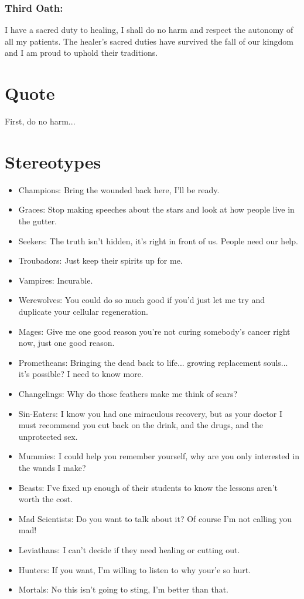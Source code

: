 \subsubsection*{Third Oath:} I have a sacred duty to healing, I shall do no harm and respect the autonomy of all my patients. The healer's sacred duties have survived the fall of our kingdom and I am proud to uphold their traditions.

\section*{Quote}

First, do no harm...

\section*{Stereotypes}
\begin{itemize}
\item Champions: Bring the wounded back here, I'll be ready. 
\item Graces: Stop making speeches about the stars and look at how people live in the gutter. 
\item Seekers: The truth isn't hidden, it's right in front of us. People need our help. 
\item Troubadors: Just keep their spirits up for me. 
 
\item Vampires: Incurable. 
\item Werewolves: You could do so much good if you'd just let me try and duplicate your cellular regeneration. 
\item Mages: Give me one good reason you're not curing somebody's cancer right now, just one good reason. 
\item Prometheans: Bringing the dead back to life... growing replacement souls... it's possible? I need to know more. 
\item Changelings: Why do those feathers make me think of scars?
\item Sin-Eaters: I know you had one miraculous recovery, but as your doctor I must recommend you cut back on the drink, and the drugs, and the unprotected sex.
\item Mummies: I could help you remember yourself, why are you only interested in the wands I make? 
\item Beasts: I've fixed up enough of their students to know the lessons aren't worth the cost.
\item Mad Scientists: Do you want to talk about it? Of course I'm not calling you mad!
\item Leviathans: I can't decide if they need healing or cutting out.

\item Hunters: If you want, I'm willing to listen to why your'e so hurt.
\item Mortals: No this isn't going to sting, I'm better than that. 
\end{itemize}

